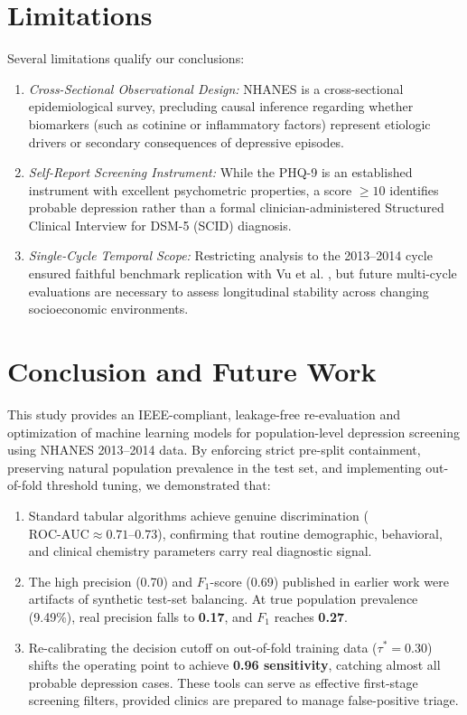 \documentclass[conference]{IEEEtran}
\begin{document}
\section{Limitations}
Several limitations qualify our conclusions:
\begin{enumerate}
    \item \textit{Cross-Sectional Observational Design:} NHANES is a cross-sectional epidemiological survey, precluding causal inference regarding whether biomarkers (such as cotinine or inflammatory factors) represent etiologic drivers or secondary consequences of depressive episodes.
    \item \textit{Self-Report Screening Instrument:} While the PHQ-9 is an established instrument with excellent psychometric properties, a score $\ge 10$ identifies probable depression rather than a formal clinician-administered Structured Clinical Interview for DSM-5 (SCID) diagnosis.
    \item \textit{Single-Cycle Temporal Scope:} Restricting analysis to the 2013--2014 cycle ensured faithful benchmark replication with Vu et al. \cite{vu2025}, but future multi-cycle evaluations are necessary to assess longitudinal stability across changing socioeconomic environments.
\end{enumerate}

\section{Conclusion and Future Work}
This study provides an IEEE-compliant, leakage-free re-evaluation and optimization of machine learning models for population-level depression screening using NHANES 2013--2014 data. By enforcing strict pre-split containment, preserving natural population prevalence in the test set, and implementing out-of-fold threshold tuning, we demonstrated that:
\begin{enumerate}
    \item Standard tabular algorithms achieve genuine discrimination ($\text{ROC-AUC} \approx 0.71$--$0.73$), confirming that routine demographic, behavioral, and clinical chemistry parameters carry real diagnostic signal.
    \item The high precision (0.70) and $F_1$-score (0.69) published in earlier work were artifacts of synthetic test-set balancing. At true population prevalence (9.49\%), real precision falls to \textbf{0.17}, and $F_1$ reaches \textbf{0.27}.
    \item Re-calibrating the decision cutoff on out-of-fold training data ($\tau^* = 0.30$) shifts the operating point to achieve \textbf{0.96 sensitivity}, catching almost all probable depression cases. These tools can serve as effective first-stage screening filters, provided clinics are prepared to manage false-positive triage.
\end{enumerate}
\end{document}
